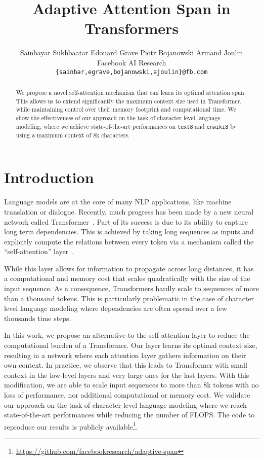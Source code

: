 \documentclass[11pt,a4paper]{article}
\title{Adaptive Attention Span in Transformers}
\author{
Sainbayar Sukhbaatar \quad Edouard Grave \quad Piotr Bojanowski \quad Armand Joulin \\
  Facebook AI Research\\
  \texttt{\{sainbar,egrave,bojanowski,ajoulin\}@fb.com} \\
}
\date{}
\begin{document}
\maketitle

\begin{abstract}
We propose a novel self-attention mechanism that can learn its optimal attention span.
This allows us to extend significantly the maximum context size used in Transformer,
while maintaining control over their memory footprint and computational time.
We show the effectiveness of our approach on the task of character level language modeling, where we achieve state-of-the-art performances on \texttt{text8} and \texttt{enwiki8} by using a maximum context of $8$k characters.
\end{abstract}

\section{Introduction}

Language models are at the core of many NLP applications, like machine translation or dialogue.
Recently, much progress has been made by a new neural network called Transformer~\citep{vaswani2017attention}.
Part of its success is due to its ability to capture long term dependencies.
This is achieved by taking long sequences as inputs and explicitly compute the relations between every token via a mechanism called the ``self-attention'' layer~\citep{al2018character}.

While this layer allows for information to propagate across long distances, it has a computational and memory cost that scales quadratically with the size of the input sequence.
As a consequence, Transformers hardly scale to sequences of more than a thousand  tokens.
This is particularly problematic in the case of character level language modeling  where dependencies are often spread over a few thousands time steps.

In this work, we propose an alternative to the self-attention layer to reduce the computational burden of a Transformer.
Our layer learns its optimal context size, resulting in a network where each attention layer gathers information on their own context.
In practice, we observe that this leads to  Transformer with small context in the low-level layers and very large ones for the last layers.
With this modification, we are able to scale input sequences to more than $8$k tokens with no loss of performance, nor additional computational or memory cost.
We validate our approach on the task of character level language modeling where we reach state-of-the-art performances while reducing the number of FLOPS.
The code to reproduce our results is publicly available\footnote{\url{https://github.com/facebookresearch/adaptive-span}}.
 
\end{document}
